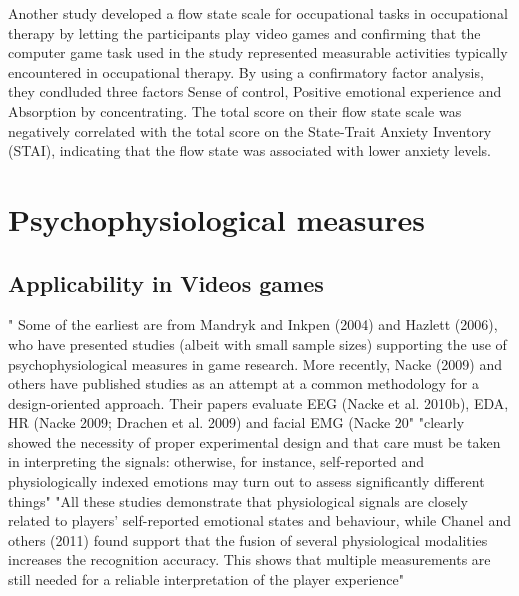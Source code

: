 Another study developed a flow state scale for occupational tasks in occupational therapy by letting the participants play video games and confirming that the computer game task used in the study represented measurable activities typically encountered in occupational therapy. By using a confirmatory factor analysis, they condluded three factors Sense of control, Positive emotional experience and Absorption by concentrating.
The total score on their flow state scale was negatively correlated with the total score on the State-Trait Anxiety Inventory (STAI), indicating that the flow state was associated with lower anxiety levels.























\section{Psychophysiological measures}

\subsection{Applicability in Videos games}
" Some of the earliest are from Mandryk and Inkpen (2004) and Hazlett (2006), who have presented studies (albeit with small sample sizes) supporting the use of psychophysiological measures in game research. More recently, Nacke (2009) and others have published studies as an attempt at a common methodology for a design-oriented approach. Their papers evaluate EEG (Nacke et al. 2010b), EDA, HR (Nacke 2009; Drachen et al. 2009) and facial EMG (Nacke 20" \cite{kivikangas2011review} "clearly showed the necessity of proper experimental design and that care must be taken in interpreting the signals: otherwise, for instance, self-reported and physiologically indexed emotions may turn out to assess significantly different things"  \cite{kivikangas2011review}
"All these studies demonstrate that physiological signals are closely related to players’ self-reported emotional states and behaviour, while Chanel and others (2011) found support that the fusion of several physiological modalities increases the recognition accuracy. This shows that multiple measurements are still needed for a reliable interpretation of the player experience"  \cite{kivikangas2011review}








